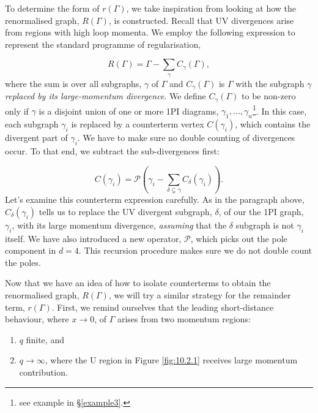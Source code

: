 \documentclass{article}
\begin{document}
To determine the form of $r(\Gamma)$, we take inspiration from looking at how the renormalised graph, $R(\Gamma)$, is constructed. Recall that UV divergences arise from regions with high loop momenta. We employ the following expression to represent the standard programme of regularisation,

\begin{equation}
    R(\Gamma) = \Gamma - \sum_\gamma C_\gamma(\Gamma),
\end{equation}
where the sum is over all subgraphs, $\gamma$ of $\Gamma$ and $C_\gamma(\Gamma)$ is $\Gamma$ with the subgraph $\gamma$ \textit{replaced by its large-momentum divergence}. We define $C_\gamma(\Gamma)$ to be non-zero only if $\gamma$ is a disjoint union of one or more 1PI diagrams, $\gamma_1,\dots,\gamma_n$\footnote{see example in \S\ref{example3}.}. In this case, each subgraph $\gamma_i$ is replaced by a counterterm vertex $C(\gamma_i)$, which contains the divergent part of $\gamma_i$. We have to make sure no double counting of divergences occur. To that end, we subtract the sub-divergences first:

\begin{equation}
    C(\gamma_i) = \mathcal{P}\left(\gamma_i - \sum_{\delta \varsubsetneq \gamma}C_\delta(\gamma_i)\right).
    \label{counterterm gamma}
\end{equation}
Let's examine this counterterm expression carefully. As in the paragraph above, $C_\delta(\gamma_i)$ tells us to replace the UV divergent subgraph, $\delta$, of our the 1PI graph, $\gamma_i$, with its large momentum divergence, \textit{assuming} that the $\delta$ subgraph is not $\gamma_i$ itself. We have also introduced a new operator, $\mathcal{P}$, which picks out the pole component in $d=4$. This recursion procedure makes sure we do not double count the poles. 

Now that we have an idea of how to isolate counterterms to obtain the renormalised graph, $R(\Gamma)$, we will try a similar strategy for the remainder term, $r(\Gamma)$. First, we remind ourselves that the leading short-distance behaviour, where $x\rightarrow 0$, of $\Gamma$ arises from two momentum regions:

\begin{enumerate}
    \item $q$ finite, and
    \item $q\rightarrow \infty$, where the U region in Figure \ref{fig:10.2.1} receives large momentum contribution.
\end{enumerate}
\end{document}
